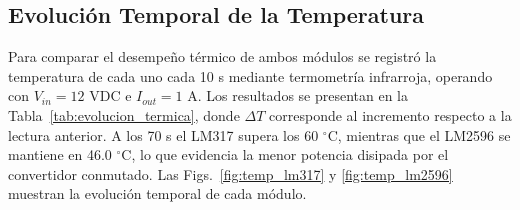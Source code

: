 \documentclass[conference]{IEEEtran}
\begin{document}
\FloatBarrier
\subsection{\textbf{Evolución Temporal de la Temperatura}}
Para comparar el desempeño térmico de ambos módulos se registró la temperatura de cada uno cada 10 s mediante termometría infrarroja, operando con $V_{in}=12$ VDC e $I_{out}=1$ A. Los resultados se presentan en la Tabla~\ref{tab:evolucion_termica}, donde $\Delta T$ corresponde al incremento respecto a la lectura anterior. A los 70 s el LM317 supera los 60 $^{\circ}$C, mientras que el LM2596 se mantiene en 46.0 $^{\circ}$C, lo que evidencia la menor potencia disipada por el convertidor conmutado. Las Figs.~\ref{fig:temp_lm317} y \ref{fig:temp_lm2596} muestran la evolución temporal de cada módulo.

\begin{table}[!htb]
\caption{Registros de elevación de temperatura medidos por termometría infrarroja ($V_{in}=12\text{ VDC}$, $I_{out}=1\text{ A}$).}
\begin{center}
\label{tab:evolucion_termica}
\end{center}
\end{table}
\end{document}
